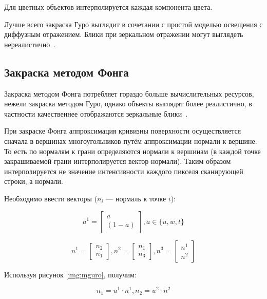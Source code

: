 Для цветных объектов интерполируется каждая компонента цвета.

Лучше всего закраска Гуро выглядит в сочетании с простой моделью освещения с диффузным отражением. Блики при зеркальном отражении могут выглядеть нереалистично~\cite{light}.

\subsection{Закраска методом Фонга}

Закраска методом Фонга потребляет гораздо больше вычислительных ресурсов, нежели закраска методом Гуро, однако объекты выглядят более реалистично, в частности качественнее отображаются зеркальные блики~\cite{light}.

При закраске Фонга аппроксимация кривизны поверхности осуществляется сначала в вершинах многоугольников путём аппроксимации нормали к вершине. То есть по нормалям к грани определяются нормали к вершинам (в каждой точке закрашиваемой грани интерполируется вектор нормали). Таким образом интерполируется не значение интенсивности каждого пикселя сканирующей строки, а нормали.

Необходимо ввести векторы ($n_i$ --- нормаль к точке $i$):

\begin{equation}
	a^1 = \begin{bmatrix}
		a\\
		(1-a)
	\end{bmatrix}, a \in \{u, w, t\}
\end{equation}

\begin{equation}
	n^1 = \begin{bmatrix}
		n_2\\
		n_1
	\end{bmatrix},
	n^2 = \begin{bmatrix}
		n_1\\
		n_3
	\end{bmatrix},
	n^3 = \begin{bmatrix}
		n^1\\
		n^2
	\end{bmatrix}
\end{equation}

Используя рисунок \ref{img:mguro}, получим:

\begin{equation}
	n_1 = u^1 \cdot n^1,
	n_2 = u^2 \cdot n^2
\end{equation}

